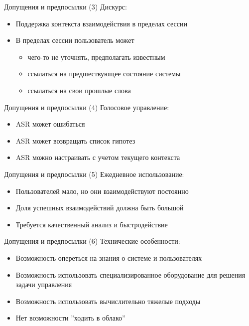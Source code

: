 \documentclass{beamer}
\begin{document}
\begin{frame}{Допущения и предпосылки (3)}
Дискурс:\\
\bigskip
\begin{itemize}
	\item Поддержка контекста взаимодействия в пределах сессии 
	\item В пределах сессии пользователь может
		\begin{itemize}
			\item чего-то не уточнять, предполагать известным
			\item ссылаться на предшествующее состояние системы
			\item ссылаться на свои прошлые слова
		\end{itemize}
\end{itemize}
\end{frame}

\begin{frame}{Допущения и предпосылки (4)}
Голосовое управление:\\
\bigskip
\begin{itemize}
	\item ASR может ошибаться
	\item ASR может возвращать список гипотез
	\item ASR можно настраивать с учетом текущего контекста
\end{itemize}
\end{frame}

\begin{frame}{Допущения и предпосылки (5)}
Ежедневное использование:\\
\bigskip
\begin{itemize}
	\item Пользователей мало, но они взаимодействуют постоянно
	\item Доля успешных взаимодействий должна быть большой
	\item Требуется качественный анализ и быстродействие
\end{itemize}
\end{frame}

\begin{frame}{Допущения и предпосылки (6)}
Технические особенности:\\
\bigskip
\begin{itemize}
	\item Возможность опереться на знания о системе и пользователях
	\item Возможность использовать специализированное оборудование для решения задачи управления
	\item Возможность использовать вычислительно тяжелые подходы
	\item Нет возможности ''ходить в облако''
\end{itemize}
\end{frame}
\end{document}

